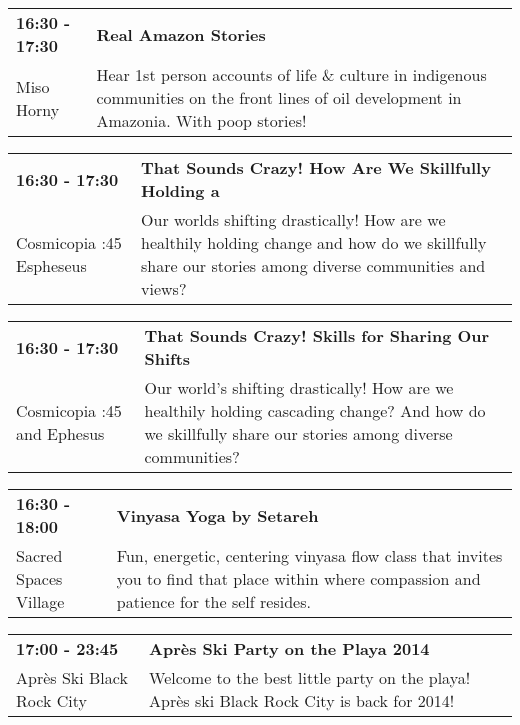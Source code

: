 \begin{tabular}{ p{1in} p{2.2in} }
    \textbf{16:30 - 17:30} & \textbf{Real Amazon Stories} \\
    Miso Horny \newline  & Hear 1st person accounts of life \& culture in indigenous communities on the front lines of oil development in Amazonia. With poop stories! \\
    \hline 
\end{tabular}
    
\begin{tabular}{ p{1in} p{2.2in} }
    \textbf{16:30 - 17:30} & \textbf{That Sounds Crazy! How Are We Skillfully Holding a} \\
    Cosmicopia \newline 3:45 Espheseus & Our worlds shifting drastically! How are we healthily holding change and how do we skillfully share our stories among diverse communities and views? \\
    \hline 
\end{tabular}
    
\begin{tabular}{ p{1in} p{2.2in} }
    \textbf{16:30 - 17:30} & \textbf{That Sounds Crazy! Skills for Sharing Our Shifts} \\
    Cosmicopia \newline 3:45 and Ephesus & Our world's shifting drastically! How are we healthily holding cascading change? And how do we skillfully share our stories among diverse communities? \\
    \hline 
\end{tabular}
    
\begin{tabular}{ p{1in} p{2.2in} }
    \textbf{16:30 - 18:00} & \textbf{Vinyasa Yoga by Setareh} \\
    Sacred Spaces Village \newline  & Fun, energetic, centering vinyasa flow class that invites you to find that place within where compassion and patience for the self resides. \\
    \hline 
\end{tabular}
    
\begin{tabular}{ p{1in} p{2.2in} }
    \textbf{17:00 - 23:45} & \textbf{Apr\`es Ski Party on the Playa 2014} \\
    Apr\`es Ski Black Rock City \newline  & Welcome to the best little party on the playa! Apr\`es ski Black Rock City is back for 2014! \\
    \hline 
\end{tabular}
    
